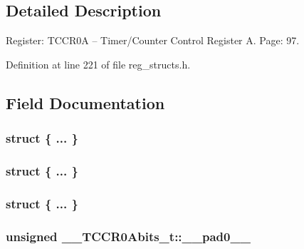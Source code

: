 \subsection{Detailed Description}
Register\+: T\+C\+C\+R0\+A -- Timer/\+Counter Control Register A. Page\+: 97. 

Definition at line 221 of file reg\+\_\+structs.\+h.



\subsection{Field Documentation}
\hypertarget{union_____t_c_c_r0_abits__t_a7275705744aa3c23bcaffbba89e97dfa}{\subsubsection[{"@51}]{\setlength{\rightskip}{0pt plus 5cm}struct \{ ... \} }}\label{union_____t_c_c_r0_abits__t_a7275705744aa3c23bcaffbba89e97dfa}
\hypertarget{union_____t_c_c_r0_abits__t_aa559ad802f2cb439664d3b9612fe2d1c}{\subsubsection[{"@53}]{\setlength{\rightskip}{0pt plus 5cm}struct \{ ... \} }}\label{union_____t_c_c_r0_abits__t_aa559ad802f2cb439664d3b9612fe2d1c}
\hypertarget{union_____t_c_c_r0_abits__t_a8665a132cb1950ac57dbef411508685f}{\subsubsection[{"@55}]{\setlength{\rightskip}{0pt plus 5cm}struct \{ ... \} }}\label{union_____t_c_c_r0_abits__t_a8665a132cb1950ac57dbef411508685f}
\hypertarget{union_____t_c_c_r0_abits__t_afeb89056b30f7367265593efed652c0c}{
\subsubsection[{\+\_\+\+\_\+pad0\+\_\+\+\_\+}]{\setlength{\rightskip}{0pt plus 5cm}unsigned \+\_\+\+\_\+\+T\+C\+C\+R0\+Abits\+\_\+t\+::\+\_\+\+\_\+pad0\+\_\+\+\_\+}}\label{union_____t_c_c_r0_abits__t_afeb89056b30f7367265593efed652c0c}


